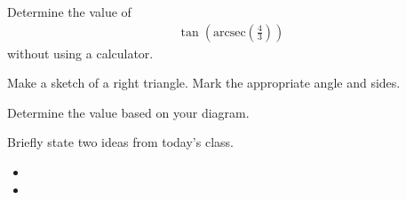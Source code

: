 \begin{problem}
  \clearpage

\item Determine the value of
  \begin{eqnarray*}
    \tan\left(\mathrm{arcsec}\left(\frac{4}{3}\right)\right)
  \end{eqnarray*}
  without using a calculator.

  \begin{subproblem}
  \item Make a sketch of a right triangle. Mark the appropriate angle
    and sides.
    \vfill
  \item Determine the value based on your diagram.
    \vfill
    \vfill
  \end{subproblem}

\end{problem}

\postClass

\begin{problem}
\item Briefly state two ideas from today's class.
  \begin{itemize}
  \item
  \item
  \end{itemize}
\item
  \begin{subproblem}
    \item
  \end{subproblem}
\end{problem}


